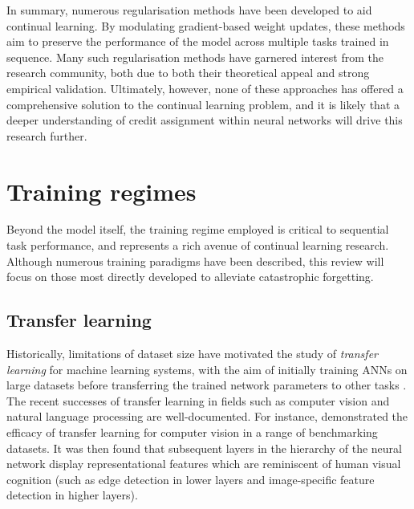 \documentclass{article} %
\begin{document}
In summary, numerous regularisation methods have been developed to aid continual learning. By modulating gradient-based weight updates, these methods aim to preserve the performance of the model across multiple tasks trained in sequence. Many such regularisation methods have garnered interest from the research community, both due to both their theoretical appeal and strong empirical validation. Ultimately, however, none of these approaches has offered a comprehensive solution to the continual learning problem, and it is likely that a deeper understanding of credit assignment within neural networks will drive this research further.

\section*{Training regimes}

Beyond the model itself, the training regime employed is critical to sequential task performance, and represents a rich avenue of continual learning research. Although numerous training paradigms have been described, this review will focus on those most directly developed to alleviate catastrophic forgetting.

\subsection*{Transfer learning}

Historically, limitations of dataset size have motivated the study of \textit{transfer learning} for machine learning systems, with the aim of initially training ANNs on large datasets before transferring the trained network parameters to other tasks \citep{bengio2012practical,higgins2016early}. The recent successes of transfer learning in fields such as computer vision and natural language processing are well-documented. For instance, \citet{yosinski2014transferable} demonstrated the efficacy of transfer learning for computer vision in a range of benchmarking datasets. It was then found that subsequent layers in the hierarchy of the neural network display representational features which are reminiscent of human visual cognition (such as edge detection in lower layers and image-specific feature detection in higher layers).
\end{document}
